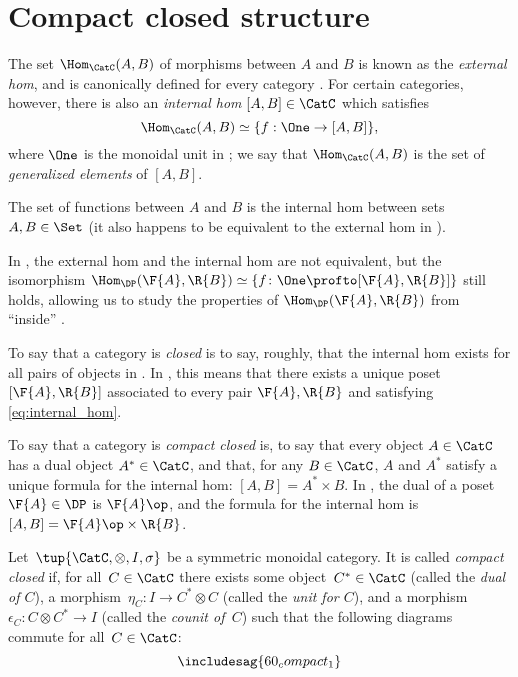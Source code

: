 

\section{Compact closed structure}
\label{sec:higher-compact-closed}

\begin{ctdefinition}
  The set $\Hom_\CatC(A,B)$ of morphisms between $A$ and $B$ is known as the \emph{external hom}, and is canonically defined for every category \CatC. For certain categories, however, there is also an \emph{internal hom} $[A,B] \in \CatC$ which satisfies
  \begin{equation}
    \label{eq:internal_hom}
    \Hom_\CatC(A,B) \simeq \{ f : \One \to [A,B] \},
  \end{equation}
  where $\One$ is the monoidal unit in \CatC; we say that $\Hom_\CatC(A,B)$ is the set of \emph{generalized elements} of $[A,B]$.
\end{ctdefinition}

\begin{example}
  The set of functions between $A$ and $B$ is the internal hom between sets $A,B \in \Set$ (it also happens to be equivalent to the external hom in \Set).
\end{example}

In \DP, the external hom and the internal hom are not equivalent, but the isomorphism $\Hom_\DP(\F{A},\R{B}) \simeq \{ f \colon \One \profto [\F{A},\R{B}] \}$ still holds, allowing us to study the properties of $\Hom_\DP(\F{A},\R{B})$ from ``inside'' \DP.

To say that a category \CatC is \emph{closed} is to say, roughly, that the internal hom exists for all pairs of objects in \CatC. In \DP, this means that there exists a unique poset $[\F{A},\R{B}]$ associated to every pair $\F{A},\R{B}$ and satisfying \cref{eq:internal_hom}.

To say that a category \CatC is \emph{compact closed} is, to say that every object $A \in \CatC$ has a dual object $A^* \in \CatC$, and that, for any $B \in \CatC$, $A$ and $A^*$ satisfy a unique formula for the internal hom: $[A,B] = A^* \times B$. In \DP, the dual of a poset $\F{A} \in \DP$ is $\F{A}\op$, and the formula for the internal hom is $[A,B]=\F{A}\op \times \R{B}$.

\begin{ctdefinition}
  Let~$\tup{\CatC,\otimes,I,\sigma}$ be a symmetric monoidal category. It is called \emph{compact closed} if, for all~$C \in\CatC$ there exists some object~$C^*\in\CatC$ (called the \emph{dual of $C$}), a morphism~$\eta_C\colon I\to C^*\otimes C$ (called the \emph{unit for $C$}), and a morphism~$\epsilon_C\colon C\otimes C^*\to I$ (called the \emph{counit of~$C$}) such that the following diagrams commute for all~$C\in \CatC$:
  \begin{equation}
    \label{eq:ccc}
    \includesag{60_compact_1}
  \end{equation}
  ~
  \begin{center}
  \end{center}
\end{ctdefinition}

